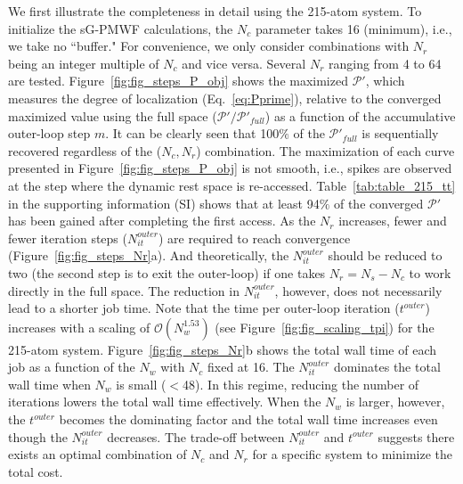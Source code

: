 \documentclass[journal=jacsat,manuscript=article]{achemso}
\begin{document}
We first illustrate the completeness in detail using the 215-atom system.  To initialize the sG-PMWF calculations, the $N_c$ parameter takes 16 (minimum), i.e., we take no ``buffer." For convenience, we only consider combinations with $N_r$ being an integer multiple of $N_c$ and vice versa. Several $N_r$ ranging from 4 to 64 are tested. Figure~\ref{fig:fig_steps_P_obj} shows the maximized $\mathcal{P}'$, which measures the degree of localization (Eq.~\eqref{eq:Pprime}), relative to the converged maximized value using the full space ($\mathcal{P}' / \mathcal{P}'_{full}$) as a function of the accumulative outer-loop step $m$. It can be clearly seen that 100$\%$ of the $\mathcal{P}'_{full}$ is sequentially recovered regardless of the ($N_c,N_r$) combination. The maximization of each curve presented in Figure~\ref{fig:fig_steps_P_obj} is not smooth, i.e., spikes are observed at the step where the dynamic rest space is re-accessed. Table~\ref{tab:table_215_tt} in the supporting information (SI) shows that at least 94$\%$ of the converged $\mathcal{P}'$ has been gained after completing the first access. As the $N_r$ increases, fewer and fewer iteration steps ($N_{it}^{outer}$) are required to reach convergence (Figure~\ref{fig:fig_steps_Nr}a). And theoretically, the $N_{it}^{outer}$ should be reduced to two (the second step is to exit the outer-loop) if one takes $N_r = N_s - N_c$ to work directly in the full space. The reduction in $N^{outer}_{it}$, however, does not necessarily lead to a shorter job time. Note that the time per outer-loop iteration ($t^{outer}$) increases with a scaling of $\mathcal{O}(N_w^{1.53})$ (see Figure~\ref{fig:fig_scaling_tpi}) for the 215-atom system. Figure~\ref{fig:fig_steps_Nr}b shows the total wall time of each job as a function of the $N_w$ with $N_c$ fixed at 16. The $N^{outer}_{it}$ dominates the total wall time when $N_w$ is small ($<$48). In this regime, reducing the number of iterations lowers the total wall time effectively. When the $N_w$ is larger, however, the $t^{outer}$ becomes the dominating factor and the total wall time increases even though the $N^{outer}_{it}$ decreases. The trade-off between $N^{outer}_{it}$ and $t^{outer}$ suggests there exists an optimal combination of $N_c$ and $N_r$ for a specific system to minimize the total cost.
\end{document}
